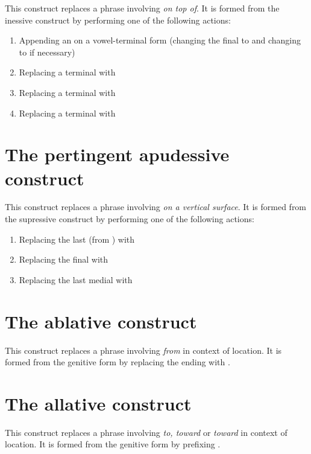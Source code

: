 \documentclass{book}
\begin{document}
This construct replaces a phrase involving  \emph{on top of}. It is formed from the inessive construct by performing one of the following actions:

\begin{enumerate}
  \item Appending an  on a vowel-terminal form (changing the final  to  and changing  to  if necessary)
  \item Replacing a terminal  with 
  \item Replacing a terminal  with 
  \item Replacing a terminal  with 
\end{enumerate}

\section{The pertingent apudessive construct}

This construct replaces a phrase involving  \emph{on a vertical surface}. It is formed from the supressive construct by performing one of the following actions:

\begin{enumerate}
  \item Replacing the last  (from ) with 
  \item Replacing the final  with 
  \item Replacing the last medial  with 
\end{enumerate}

\section{The ablative construct}

This construct replaces a phrase involving  \emph{from} in context of location. It is formed from the genitive form by replacing the ending with .

\section{The allative construct}

This construct replaces a phrase involving  \emph{to, toward} or  \emph{toward} in context of location. It is formed from the genitive form by prefixing .
\end{document}
